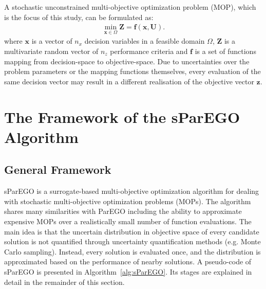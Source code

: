 \documentclass{llncs}
\newcommand{\brr}[1]{{\left({#1}\right)}} %
\newcommand{\vx}{\mathbf{x}} %
\newcommand{\vf}{\mathbf{f}} %
\newcommand{\vz}{\mathbf{z}} %
\newcommand{\vZ}{\mathbf{Z}} %
\newcommand{\vU}{\mathbf{U}} %
\begin{document}
A stochastic unconstrained multi-objective optimization problem (MOP), which is the focus of this study, can be formulated as:
\begin{align}
\label{eq:mop}
	\min_{\vx\in\Omega} \vZ=\vf\brr{\vx, \vU}.
\end{align}
where $\vx$ is a vector of $n_x$ decision variables in a feasible domain $\Omega$, $\vZ$ is a multivariate random vector of $n_z$ performance criteria and $\vf$ is a set of functions mapping from decision-space to objective-space. Due to uncertainties over the problem parameters or the mapping functions themselves, every evaluation of the same decision vector may result in a different realisation of the objective vector $\vz$.

\section{The Framework of the sParEGO Algorithm}\label{sec:framework}

\subsection{General Framework}

sParEGO is a surrogate-based multi-objective optimization algorithm for dealing with stochastic multi-objective optimization problems (MOPs). The algorithm shares many similarities with ParEGO including the ability to approximate expensive MOPs over a realistically small number of function evaluations. The main idea is that the uncertain distribution in objective space of every candidate solution is not quantified through uncertainty quantification methods (e.g. Monte Carlo sampling). Instead, every solution is evaluated once, and the distribution is approximated based on the performance of nearby solutions. A pseudo-code of sParEGO is presented in Algorithm~\ref{alg:sParEGO}. Its stages are explained in detail in the remainder of this section.
\end{document}
